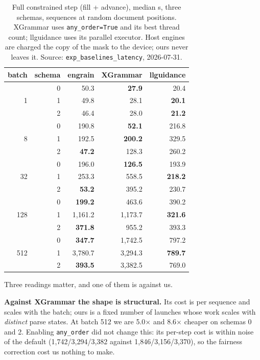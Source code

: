 \documentclass{article}
\begin{document}
\begin{table}[t]
\caption{Full constrained step (fill + advance), median \textmu{}s, three
schemas, sequences at random document positions. XGrammar uses
\texttt{any\_order=True} and its best thread count; llguidance uses its
parallel executor. Host engines are charged the copy of the mask to the device;
ours never leaves it. Source: \texttt{exp\_baselines\_latency}, 2026-07-31.}
\label{tab:step}
\vskip 0.1in
\begin{center}
\begin{small}
\begin{tabular}{rrrrr}
\toprule
batch & schema & engrain & XGrammar & llguidance \\
\midrule
\multirow{3}{*}{1}
 & 0 & 50.3 & \textbf{27.9} & 20.4 \\
 & 1 & 49.8 & 28.1 & \textbf{20.1} \\
 & 2 & 46.4 & 28.0 & \textbf{21.2} \\
\midrule
\multirow{3}{*}{8}
 & 0 & 190.8 & \textbf{52.1} & 216.8 \\
 & 1 & 192.5 & \textbf{200.2} & 329.5 \\
 & 2 & \textbf{47.2} & 128.3 & 260.2 \\
\midrule
\multirow{3}{*}{32}
 & 0 & 196.0 & \textbf{126.5} & 193.9 \\
 & 1 & 253.3 & 558.5 & \textbf{218.2} \\
 & 2 & \textbf{53.2} & 395.2 & 230.7 \\
\midrule
\multirow{3}{*}{128}
 & 0 & \textbf{199.2} & 463.6 & 390.2 \\
 & 1 & 1{,}161.2 & 1{,}173.7 & \textbf{321.6} \\
 & 2 & \textbf{371.8} & 955.2 & 393.3 \\
\midrule
\multirow{3}{*}{512}
 & 0 & \textbf{347.7} & 1{,}742.5 & 797.2 \\
 & 1 & 3{,}780.7 & 3{,}294.3 & \textbf{789.7} \\
 & 2 & \textbf{393.5} & 3{,}382.5 & 769.0 \\
\bottomrule
\end{tabular}
\end{small}
\end{center}
\vskip -0.1in
\end{table}

Three readings matter, and one of them is against us.

\textbf{Against XGrammar the shape is structural.} Its cost is per sequence and
scales with the batch; ours is a fixed number of launches whose work scales
with \emph{distinct} parse states. At batch 512 we are 5.0$\times$ and
8.6$\times$ cheaper on schemas 0 and 2. Enabling \texttt{any\_order} did not
change this: its per-step cost is within noise of the default
(1{,}742/3{,}294/3{,}382 against 1{,}846/3{,}156/3{,}370), so the fairness
correction cost us nothing to make.
\end{document}
